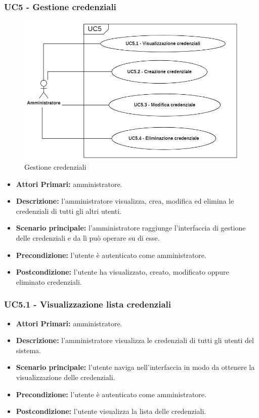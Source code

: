 \subsubsection{ UC5 - Gestione credenziali}
\begin{figure}[H]
	\centering
	\includegraphics[width=15cm]{res/images/UC5.png}
	\caption{Gestione credenziali}
	\label{fig:Gestione credenziali}
\end{figure}
\begin{itemize}
           	\item\textbf{Attori Primari:}
           	amministratore.
           	\item\textbf{Descrizione:} 
           	l'amministratore visualizza, crea, modifica ed elimina le credenziali di tutti gli altri utenti.
           	\item\textbf{Scenario principale:} 
           	l'amministratore raggiunge l'interfaccia di gestione delle credenziali e da lì può operare su di esse.
           	\item\textbf{Precondizione:} 
           	l'utente è autenticato come amministratore.
           	\item\textbf{Postcondizione:}
           	l'utente ha visualizzato, creato, modificato oppure eliminato credenziali.
\end{itemize}

\subsubsection{ UC5.1 - Visualizzazione lista credenziali}
\begin{itemize}
	\item\textbf{Attori Primari:} 
	amministratore.
	\item\textbf{Descrizione:} 
	l'amministratore visualizza le credenziali di tutti gli utenti del sistema.
	\item\textbf{Scenario principale:} 
	l'utente naviga nell'interfaccia in modo da ottenere la visualizzazione delle credenziali.
	\item\textbf{Precondizione:} 
	l'utente è autenticato come amministratore.
	\item\textbf{Postcondizione:}
	l'utente visualizza la lista delle credenziali.
\end{itemize}


